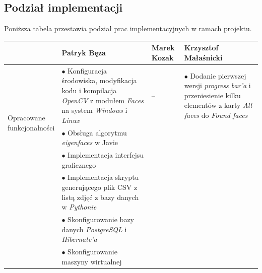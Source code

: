 \documentclass[a4paper,titlepage]{article}
\theoremstyle{break}
\numberwithin{equation}{subsection}
\begin{document}
\begin{appendices}
\subsection{Podział implementacji}

Poniższa tabela przestawia podział prac implementacyjnych w ramach projektu.

\begin{table}[H]
\center
\begin{tabular}{p{2.5cm}|p{4cm}|p{4cm}|p{4cm}}
& Patryk Bęza & Marek Kozak & Krzysztof Małaśnicki \\\hline\hline
\multirow{3}{*}{\parbox{3cm}{\ \\Opracowane \\funkcjonalności}} & $\bullet$ Konfiguracja środowiska, modyfikacja kodu i kompilacja \emph{OpenCV} z modułem \emph{Faces} na system \emph{Windows} i \emph{Linux} & -- & $\bullet$ Dodanie pierwszej wersji \emph{progress bar'a} i przeniesienie kilku elementów z karty \emph{All faces} do \emph{Found faces}\\
& $\bullet$ Obsługa algorytmu \emph{eigenfaces} w Javie & &\\
& $\bullet$ Implementacja interfejsu graficznego & &\\
& $\bullet$ Implementacja skryptu generującego plik CSV z listą zdjęć z bazy danych w \emph{Pythonie} & &\\
& $\bullet$ Skonfigurowanie bazy danych \emph{PostgreSQL} i \emph{Hibernate'a} & &\\
& $\bullet$ Skonfigurowanie maszyny wirtualnej & &\\
\end{tabular}
\end{table}

\end{appendices}


\clearpage
\printbibliography[title=Bibliografia]
\end{document}

